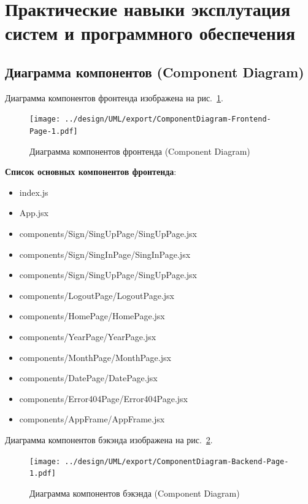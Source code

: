 \newpage
\section{Практические навыки эксплутация систем и программного обеспечения}

\subsection{Диаграмма компонентов (Component Diagram)}

Диаграмма компонентов фронтенда изображена на рис.~\ref{fig:ComponentDiagramFrontend}.

\begin{figure}[!ph]
  \centering

  \texttt{[image: ../design/UML/export/ComponentDiagram-Frontend-Page-1.pdf]}

  \caption{Диаграмма компонентов фронтенда (Component Diagram)}
  \label{fig:ComponentDiagramFrontend}
\end{figure}

\textbf{Список основных компонентов фронтенда}:
\begin{itemize}
  \item index.js
  \item App.jsx
  \item components/Sign/SingUpPage/SingUpPage.jsx
  \item components/Sign/SingInPage/SingInPage.jsx
  \item components/Sign/SingUpPage/SingUpPage.jsx
  \item components/LogoutPage/LogoutPage.jsx
  \item components/HomePage/HomePage.jsx
  \item components/YearPage/YearPage.jsx
  \item components/MonthPage/MonthPage.jsx
  \item components/DatePage/DatePage.jsx
  \item components/Error404Page/Error404Page.jsx
  \item components/AppFrame/AppFrame.jsx
\end{itemize}

Диаграмма компонентов бэкэнда изображена на рис.~\ref{fig:ComponentDiagramBackend}.

\begin{figure}[!ph]
  \centering

  \texttt{[image: ../design/UML/export/ComponentDiagram-Backend-Page-1.pdf]}

  \caption{Диаграмма компонентов бэкэнда (Component Diagram)}
  \label{fig:ComponentDiagramBackend}
\end{figure}

